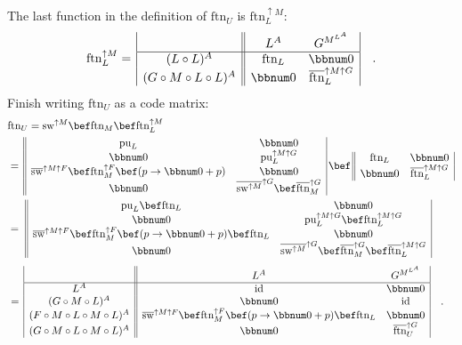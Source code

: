 The last function in the definition of $\text{ftn}_{U}$ is $\text{ftn}_{L}^{\uparrow M}$:
\[
\text{ftn}_{L}^{\uparrow M}=\,\begin{array}{|c||cc|}
 & L^{A} & G^{M^{L^{A}}}\\
\hline (L\circ L)^{A} & \text{ftn}_{L} & \bbnum 0\\
(G\circ M\circ L\circ L)^{A} & \bbnum 0 & \overline{\text{ftn}}_{L}^{\uparrow M\uparrow G}
\end{array}\quad.
\]
Finish writing $\text{ftn}_{U}$ as a code matrix:
\begin{align*}
 & \text{ftn}_{U}=\text{sw}^{\uparrow M}\bef\text{ftn}_{M}\bef\text{ftn}_{L}^{\uparrow M}\\
 & =\,\begin{array}{||cc|}
\text{pu}_{L} & \bbnum 0\\
\bbnum 0 & \text{pu}_{L}^{\uparrow M\uparrow G}\\
\overline{\text{sw}}^{\uparrow M\uparrow F}\bef\text{ftn}_{M}^{\uparrow F}\bef(p\rightarrow\bbnum 0+p) & \bbnum 0\\
\bbnum 0 & \overline{\text{sw}^{\uparrow M}}^{\uparrow G}\bef\overline{\text{ftn}}_{M}^{\uparrow G}
\end{array}\,\bef\,\begin{array}{||cc|}
\text{ftn}_{L} & \bbnum 0\\
\bbnum 0 & \overline{\text{ftn}}_{L}^{\uparrow M\uparrow G}
\end{array}\\
 & =\,\,\begin{array}{||cc|}
\text{pu}_{L}\bef\text{ftn}_{L} & \bbnum 0\\
\bbnum 0 & \text{pu}_{L}^{\uparrow M\uparrow G}\bef\text{ftn}_{L}^{\uparrow M\uparrow G}\\
\overline{\text{sw}}^{\uparrow M\uparrow F}\bef\text{ftn}_{M}^{\uparrow F}\bef(p\rightarrow\bbnum 0+p)\bef\text{ftn}_{L} & \bbnum 0\\
\bbnum 0 & \overline{\text{sw}^{\uparrow M}}^{\uparrow G}\bef\overline{\text{ftn}}_{M}^{\uparrow G}\bef\overline{\text{ftn}}_{L}^{\uparrow M\uparrow G}
\end{array}
\end{align*}
\begin{align*}
 & =\,\begin{array}{|c||cc|}
 & L^{A} & G^{M^{L^{A}}}\\
\hline L^{A} & \text{id} & \bbnum 0\\
(G\circ M\circ L)^{A} & \bbnum 0 & \text{id}\\
(F\circ M\circ L\circ M\circ L)^{A} & \overline{\text{sw}}^{\uparrow M\uparrow F}\bef\text{ftn}_{M}^{\uparrow F}\bef(p\rightarrow\bbnum 0+p)\bef\text{ftn}_{L} & \bbnum 0\\
(G\circ M\circ L\circ M\circ L)^{A} & \bbnum 0 & \overline{\text{ftn}}_{U}^{\uparrow G}
\end{array}\quad.
\end{align*}

